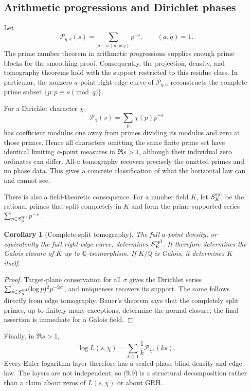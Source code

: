 \documentclass[11pt]{article}
\newtheorem{corollary}[theorem]{Corollary}
\theoremstyle{definition}
\theoremstyle{remark}
\newcommand{\cP}{\mathcal P}
\begin{document}
\subsection{Arithmetic progressions and Dirichlet phases}

Let
\[
 \cP_{q,a}(s)=\sum_{p\equiv a\, (\mathrm{mod}\,q)}p^{-s},
 \qquad (a,q)=1.
\tag{9.7}
\]
The prime number theorem in arithmetic progressions supplies enough prime blocks for
the smoothing proof.  Consequently, the projection, density, and tomography theorems
hold with the support restricted to this residue class.  In particular, the nonzero
$a$-point right-edge curve of $\cP_{q,a}$ reconstructs the complete prime subset
$\{p:p\equiv a\pmod q\}$.

For a Dirichlet character $\chi$,
\[
 \cP_\chi(s)=\sum_p\chi(p)p^{-s}
\tag{9.8}
\]
has coefficient modulus one away from primes dividing its modulus and zero at those
primes.  Hence all characters omitting the same finite prime set have identical
limiting $a$-point measures in $\Re s>1$, although their individual zero ordinates can
differ.  All-$a$ tomography recovers precisely the omitted primes and no phase data.
This gives a concrete classification of what the horizontal law can and cannot see.

There is also a field-theoretic consequence.  For a number field $K$, let
$S_K^{\rm spl}$ be the rational primes that split completely in $K$ and form the
prime-supported series $\sum_{p\in S_K^{\rm spl}}p^{-s}$.

\begin{corollary}[Complete-split tomography]
\label{cor:spectral-bauer}
The full $a$-point density, or equivalently the full right-edge curve, determines
$S_K^{\rm spl}$.  It therefore determines the Galois closure of $K$ up to
$\mathbb Q$-isomorphism.  If $K/\mathbb Q$ is Galois, it determines $K$ itself.
\end{corollary}

\begin{proof}
Target-plane conservation for all $\sigma$ gives the Dirichlet series
$\sum_{p\in S_K^{\rm spl}}(\log p)^2p^{-2\sigma}$, and uniqueness recovers its
support.  The same follows directly from edge tomography.  Bauer's theorem
\cite{Bauer1916} says that the completely split primes, up to finitely many exceptions,
determine the normal closure; the final assertion is immediate for a Galois field.
\end{proof}

Finally, in $\Re s>1$,
\[
 \log L(s,\chi)=\sum_{k\ge1}\frac1k\cP_{\chi^k}(ks).
\tag{9.9}
\]
Every Euler-logarithm layer therefore has a scaled phase-blind density and edge law.
The layers are not independent, so (9.9) is a structural decomposition rather than a
claim about zeros of $L(s,\chi)$ or about GRH.
\end{document}
